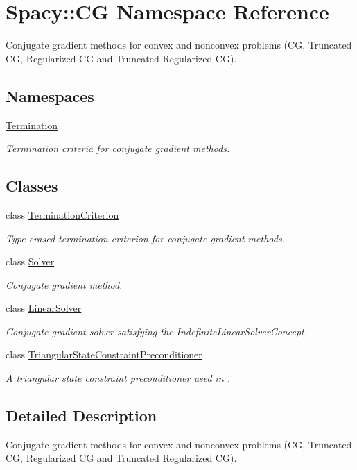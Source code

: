 \hypertarget{namespaceSpacy_1_1CG}{\section{Spacy\-:\-:C\-G Namespace Reference}
\label{namespaceSpacy_1_1CG}
}


Conjugate gradient methods for convex and nonconvex problems (C\-G, Truncated C\-G, Regularized C\-G and Truncated Regularized C\-G).  


\subsection*{Namespaces}
\begin{DoxyCompactItemize}
\item 
\hyperlink{namespaceSpacy_1_1CG_1_1Termination}{Termination}
\begin{DoxyCompactList}\small\item\em Termination criteria for conjugate gradient methods. \end{DoxyCompactList}\end{DoxyCompactItemize}
\subsection*{Classes}
\begin{DoxyCompactItemize}
\item 
class \hyperlink{classSpacy_1_1CG_1_1TerminationCriterion}{Termination\-Criterion}
\begin{DoxyCompactList}\small\item\em Type-\/erased termination criterion for conjugate gradient methods. \end{DoxyCompactList}\item 
class \hyperlink{classSpacy_1_1CG_1_1Solver}{Solver}
\begin{DoxyCompactList}\small\item\em Conjugate gradient method. \end{DoxyCompactList}\item 
class \hyperlink{classSpacy_1_1CG_1_1LinearSolver}{Linear\-Solver}
\begin{DoxyCompactList}\small\item\em Conjugate gradient solver satisfying the Indefinite\-Linear\-Solver\-Concept. \end{DoxyCompactList}\item 
class \hyperlink{classSpacy_1_1CG_1_1TriangularStateConstraintPreconditioner}{Triangular\-State\-Constraint\-Preconditioner}
\begin{DoxyCompactList}\small\item\em A triangular state constraint preconditioner used in \cite{Lubkoll2015a}. \end{DoxyCompactList}\end{DoxyCompactItemize}


\subsection{Detailed Description}
Conjugate gradient methods for convex and nonconvex problems (C\-G, Truncated C\-G, Regularized C\-G and Truncated Regularized C\-G). 